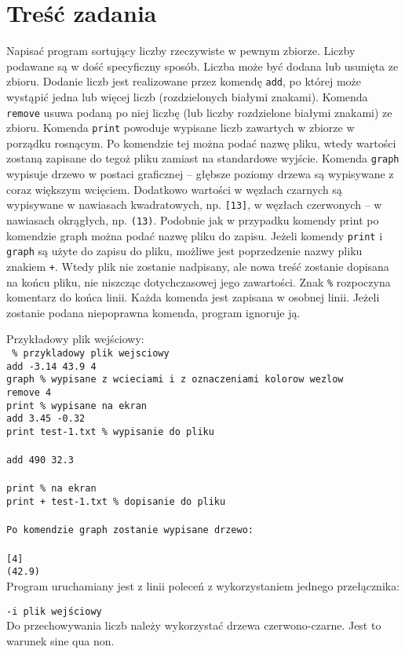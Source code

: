 \section{Treść zadania}
\begin{justify}
Napisać program sortujący liczby rzeczywiste w pewnym zbiorze. Liczby podawane są w dość specyﬁczny sposób. Liczba może być dodana lub usunięta ze zbioru. Dodanie liczb jest realizowane przez komendę \texttt{add}, po której może wystąpić jedna lub więcej liczb (rozdzielonych białymi znakami). Komenda \texttt{remove} usuwa podaną po niej liczbę (lub liczby rozdzielone białymi znakami) ze zbioru. Komenda \texttt{print} powoduje wypisane liczb zawartych w zbiorze w porządku rosnącym. Po komendzie tej można podać nazwę pliku, wtedy wartości zostaną zapisane do tegoż pliku zamiast na standardowe wyjście. Komenda \texttt{graph} wypisuje drzewo w postaci graﬁcznej – głębsze poziomy drzewa są wypisywane z coraz większym wcięciem. Dodatkowo wartości w węzłach czarnych są wypisywane w nawiasach kwadratowych, np. \texttt{[13]}, w węzłach czerwonych – w nawiasach okrągłych, np. \texttt{(13)}. Podobnie jak w przypadku komendy print po komendzie graph można podać nazwę pliku do zapisu. Jeżeli komendy \texttt{print} i \texttt{graph} są użyte do zapisu do pliku, możliwe jest poprzedzenie nazwy pliku znakiem \texttt{+}. Wtedy plik nie zostanie nadpisany, ale nowa treść zostanie dopisana na końcu pliku, nie niszcząc dotychczasowej jego zawartości. Znak \texttt{\%} rozpoczyna komentarz do końca linii. Każda komenda jest zapisana w osobnej linii. Jeżeli zostanie podana niepoprawna komenda, program ignoruje ją. \par

Przykładowy plik wejściowy:\\
\texttt{
\% przykladowy plik wejsciowy\\
add -3.14 43.9 4\\
graph \% wypisane z wcieciami i z oznaczeniami kolorow wezlow \\
remove 4\\
print \% wypisane na ekran\\
add 3.45 -0.32\\
print test-1.txt \% wypisanie do pliku\\
\\
add 490 32.3\\
\\
print \% na ekran \\
print + test-1.txt \% dopisanie do pliku\\
\\
\textrm{Po komendzie \texttt{graph} zostanie wypisane drzewo:} \\
\\
{[4]}\\
\indent(42.9) \\
\break
}
Program uruchamiany jest z linii poleceń z wykorzystaniem jednego przełącznika: \par
\texttt {-i plik wejściowy} \\
Do przechowywania liczb należy wykorzystać drzewa czerwono-czarne. Jest to warunek sine qua non.\\
\end{justify}

